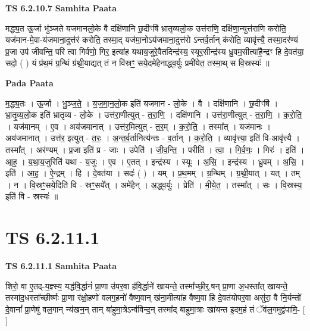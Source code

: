 \documentclass[17pt]{extarticle}
\begin{document}
\textbf{TS 6.2.10.7 } \newline
\textbf{Samhita Paata} \newline

मद्ध्य॒त ऊ॒र्जा भु॑ञ्जते यजमानलो॒के वै दक्षि॑णानि छ॒दीꣳषि॑ भ्रातृव्यलो॒क उत्त॑राणि॒ दक्षि॑णा॒न्युत्त॑राणि करोति॒ यज॑मान-मे॒वा-य॑जमाना॒दुत्त॑रं करोति॒ तस्मा॒द् यज॑मा॒नोऽय॑जमाना॒दुत्त॑रो ऽन्तर्व॒र्तान् क॑रोति॒ व्यावृ॑त्त्यै॒ तस्मा॒दर॑ण्यं प्र॒जा उप॑ जीवन्ति॒ परि॑ त्वा गिर्वणो॒ गिर॒ इत्या॑ह यथाय॒जुरे॒वैतदिन्द्र॑स्य॒ स्यूर॒सीन्द्र॑स्य ध्रु॒वम॒सीत्या॑है॒न्द्रꣳ हि दे॒वत॑या॒ सदो॒ ( ) यं प्र॑थ॒मं ग्र॒न्थिं ग्र॑थ्नी॒याद्यत् तं न वि॑स्रꣳ॒॒ सये॒दमे॑हेनाद्ध्व॒र्युः प्रमी॑येत॒ तस्मा॒थ् स वि॒स्रस्यः॑ ॥ \newline

\textbf{Pada Paata} \newline

म॒द्ध्य॒तः । ऊ॒र्जा । भु॒ञ्ज॒ते॒ । य॒ज॒मा॒न॒लो॒क इति॑ यजमान - लो॒के । वै । दक्षि॑णानि । छ॒दीꣳषि॑ । भ्रा॒तृ॒व्य॒लो॒क इति॑ भ्रातृव्य - लो॒के । उत्त॑रा॒णीत्युत् - त॒रा॒णि॒ । दक्षि॑णानि । उत्त॑रा॒णीत्युत् - त॒रा॒णि॒ । क॒रो॒ति॒ । यज॑मानम् । ए॒व । अय॑जमानात् । उत्त॑र॒मित्युत् - त॒र॒म् । क॒रो॒ति॒ । तस्मा᳚त् । यज॑मानः । अय॑जमानात् । उत्त॑र॒ इत्युत् - त॒रः॒ । अ॒न्त॒र्व॒र्तानित्य॑न्तः - व॒र्तान् । क॒रो॒ति॒ । व्यावृ॑त्त्या॒ इति॑ वि-आवृ॑त्त्यै । तस्मा᳚त् । अर॑ण्यम् । प्र॒जा इति॑ प्र - जाः । उपेति॑ । जी॒व॒न्ति॒ । परीति॑ । त्वा॒ । गि॒र्व॒णः॒ । गिरः॑ । इति॑ । आ॒ह॒ । य॒था॒य॒जुरिति॑ यथा - य॒जुः । ए॒व । ए॒तत् । इन्द्र॑स्य । स्यूः । अ॒सि॒ । इन्द्र॑स्य । ध्रु॒वम् । अ॒सि॒ । इति॑ । आ॒ह॒ । ऐ॒न्द्रम् । हि । दे॒वत॑या । सदः॑ ( ) । यम् । प्र॒थ॒मम् । ग्र॒न्थिम् । ग्र॒थ्नी॒यात् । यत् । तम् । न । वि॒स्रꣳ॒॒सये॒दिति॑ वि - स्रꣳ॒॒सये᳚त् । अमे॑हेन् । अ॒द्ध्व॒र्युः । प्रेति॑ । मी॒ये॒त॒ । तस्मा᳚त् । सः । वि॒स्रस्य॒ इति॑ वि - स्रस्यः॑ ॥  \newline




\section*{ TS 6.2.11.1 }

\textbf{TS 6.2.11.1 } \newline
\textbf{Samhita Paata} \newline

शिरो॒ वा ए॒तद्-य॒ज्ञ्स्य॒ यद्ध॑वि॒र्द्धानं॑ प्रा॒णा उ॑पर॒वा ह॑वि॒र्द्धाने॑ खायन्ते॒ तस्मा᳚च्छी॒र्॒.षन् प्रा॒णा अ॒धस्ता᳚त् खायन्ते॒ तस्मा॑द॒धस्ता᳚च्छीर्ष्णः प्रा॒णा र॑क्षो॒हणो॑ वलग॒हनो॑ वैष्ण॒वान् ख॑ना॒मीत्या॑ह वैष्ण॒वा हि दे॒वत॑योपर॒वा असु॑रा॒ वै नि॒र्यन्तो॑ दे॒वानां᳚ प्रा॒णेषु॑ वल॒गान् न्य॑खन॒न् तान् बा॑हुमा॒त्रेऽन्व॑विन्द॒न् तस्मा᳚द् बाहुमा॒त्राः खा॑यन्त इ॒दम॒हं तं ॅव॑ल॒गमुद्व॑पामि॒- [  ] \newline
\end{document}
